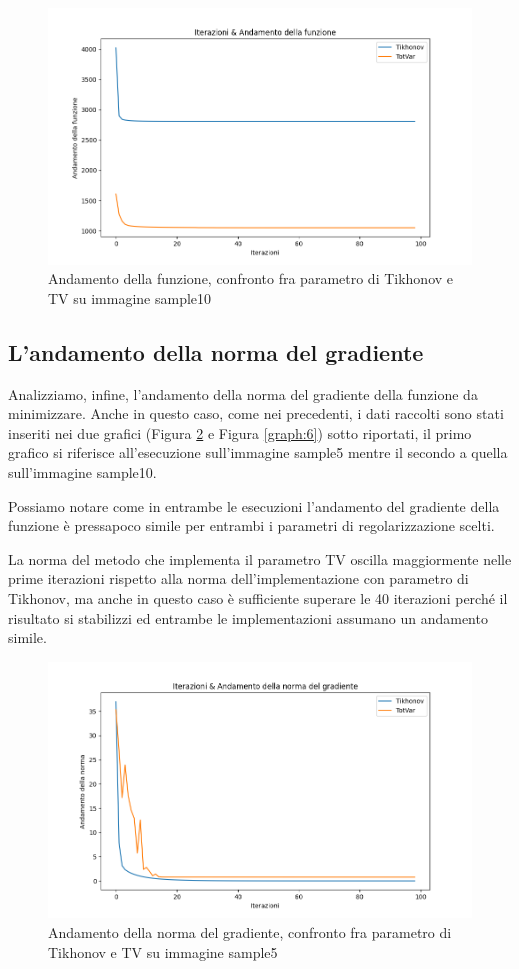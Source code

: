 \documentclass[12pt]{article}
\begin{document}
    \begin{figure}[h!]
    \centering
    \includegraphics[width=12cm]{fun-sample10}
    \caption{Andamento della funzione, confronto fra parametro di Tikhonov e TV su immagine sample10}
    \label{graph:4}
    \end{figure}

\cleardoublepage

\cleardoublepage
    \subsection{L'andamento della norma del gradiente}
    Analizziamo, infine, l'andamento della norma del gradiente della funzione da minimizzare. Anche in questo caso, come nei precedenti, i dati raccolti sono stati inseriti nei due grafici (Figura \ref{graph:5} e Figura \ref{graph:6}) sotto riportati, il primo grafico si riferisce all'esecuzione sull'immagine sample5 mentre il secondo a quella sull'immagine sample10.


    Possiamo notare come in entrambe le esecuzioni l'andamento del gradiente della funzione è pressapoco simile per entrambi i parametri di regolarizzazione scelti.

    La norma del metodo che implementa il parametro TV oscilla maggiormente nelle prime iterazioni rispetto alla norma dell'implementazione con parametro di Tikhonov, ma anche in questo caso è sufficiente superare le 40 iterazioni perché il risultato si stabilizzi ed entrambe le implementazioni assumano un andamento simile.

    \begin{figure}[h!]
    \centering
    \includegraphics[width=12cm]{norma-sample5}
    \caption{Andamento della norma del gradiente, confronto fra parametro di Tikhonov e TV su immagine sample5}
    \label{graph:5}
    \end{figure}
\end{document}

